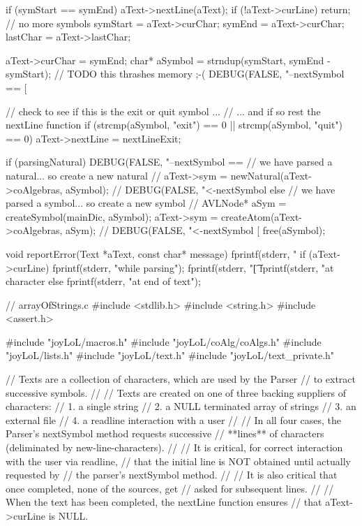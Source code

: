 {{    if (symStart == symEnd) {
      aText->nextLine(aText);
      if (!aText->curLine) return; // no more symbols
      symStart = aText->curChar;
      symEnd   = aText->curChar;
      lastChar = aText->lastChar;
    }
  }

  aText->curChar = symEnd;
  char* aSymbol = strndup(symStart, symEnd - symStart); // TODO this thrashes memory ;-(
  DEBUG(FALSE, "--nextSymbol == [%

  // check to see if this is the exit or quit symbol ...
  // ... and if so rest the nextLine function
  if (strcmp(aSymbol, "exit") == 0 || strcmp(aSymbol, "quit") == 0) {
    aText->nextLine = nextLineExit;
  }

  if (parsingNatural) {
    DEBUG(FALSE, "--nextSymbol == %
    // we have parsed a natural... so create a new natural
    //
    aText->sym = newNatural(aText->coAlgebras, aSymbol);
    //
    DEBUG(FALSE, "<-nextSymbol %
  } else {
    // we have parsed a symbol... so create a new symbol
    //
    AVLNode* aSym = createSymbol(mainDic, aSymbol);
    aText->sym = createAtom(aText->coAlgebras, aSym);
    //
    DEBUG(FALSE, "<-nextSymbol [%
  }
  free(aSymbol);
}

void reportError(Text *aText, const char* message) {
  fprintf(stderr, "\n\n%
  if (aText->curLine) {
    fprintf(stderr, "while parsing\n");
    fprintf(stderr, "\t[%
    fprintf(stderr, "at character %
  } else {
    fprintf(stderr, "at end of text\n\n");
  }
}
\stoptyping

\starttyping
// arrayOfStrings.c
#include <stdlib.h>
#include <string.h>
#include <assert.h>

#include "joyLoL/macros.h"
#include "joyLoL/coAlg/coAlgs.h"
#include "joyLoL/lists.h"
#include "joyLoL/text.h"
#include "joyLoL/text_private.h"

// Texts are a collection of characters, which are used by the Parser
// to extract successive symbols.
//
// Texts are created on one of three backing suppliers of characters:
// 1. a single string
// 2. a NULL terminated array of strings
// 3. an external file
// 4. a readline interaction with a user
//
// In all four cases, the Parser's nextSymbol method requests successive
// **lines** of characters (deliminated by new-line-characters).
//
// It is critical, for correct interaction with the user via readline,
// that the initial line is NOT obtained until actually requested by
// the parser's nextSymbol method.
//
// It is also critical that once completed, none of the sources, get
// asked for subsequent lines.
//
// When the text has been completed, the nextLine function ensures
// that aText->curLine is NULL.

